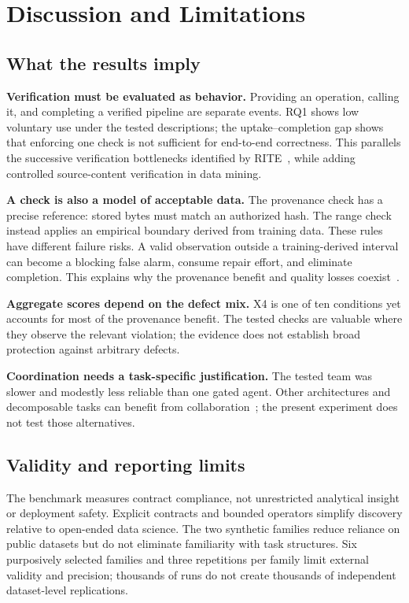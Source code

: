 \documentclass[conference]{IEEEtran}
\begin{document}
\section{Discussion and Limitations}
\label{sec:discussion}
\subsection{What the results imply}
\textbf{Verification must be evaluated as behavior.} Providing an operation, calling it, and completing a verified pipeline are separate events. RQ1 shows low voluntary use under the tested descriptions; the uptake--completion gap shows that enforcing one check is not sufficient for end-to-end correctness. This parallels the successive verification bottlenecks identified by RITE~\cite{zhang2026rite}, while adding controlled source-content verification in data mining.

\textbf{A check is also a model of acceptable data.} The provenance check has a precise reference: stored bytes must match an authorized hash. The range check instead applies an empirical boundary derived from training data. These rules have different failure risks. A valid observation outside a training-derived interval can become a blocking false alarm, consume repair effort, and eliminate completion. This explains why the provenance benefit and quality losses coexist~\cite{besanson2026sarcdq,besanson2026onegate}.

\textbf{Aggregate scores depend on the defect mix.} X4 is one of ten conditions yet accounts for most of the provenance benefit. The tested checks are valuable where they observe the relevant violation; the evidence does not establish broad protection against arbitrary defects.

\textbf{Coordination needs a task-specific justification.} The tested team was slower and modestly less reliable than one gated agent. Other architectures and decomposable tasks can benefit from collaboration~\cite{fu2026moreagents,kim2025scaling}; the present experiment does not test those alternatives.

\subsection{Validity and reporting limits}
The benchmark measures contract compliance, not unrestricted analytical insight or deployment safety. Explicit contracts and bounded operators simplify discovery relative to open-ended data science. The two synthetic families reduce reliance on public datasets but do not eliminate familiarity with task structures. Six purposively selected families and three repetitions per family limit external validity and precision; thousands of runs do not create thousands of independent dataset-level replications.
\end{document}
